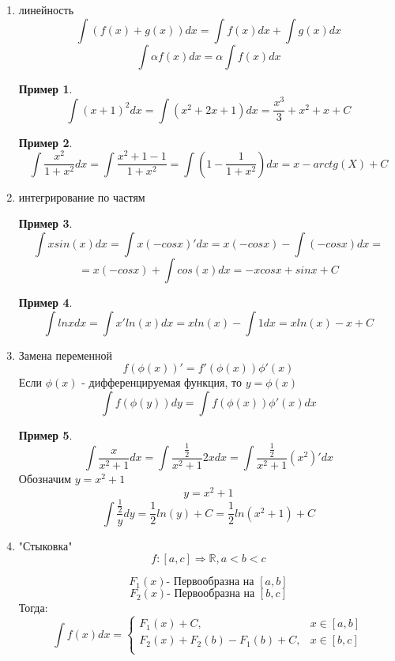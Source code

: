 \documentclass[a4paper]{article}
\theoremstyle{definition}
\newtheorem*{exmp}{Пример}
\newtheorem*{comment}{Замечание}
\numberwithin{theorem}{subsection}
\numberwithin{lemma}{subsection}
\numberwithin{definition}{subsection}
\numberwithin{comment*}{subsection}
\numberwithin{consequence}{subsection}
\numberwithin{property}{subsection}
\begin{document}
\begin{enumerate}
 \item линейность
       $$ \int (f(x) + g(x))dx = \int f(x)dx + \int g(x)dx$$
       $$ \int \alpha f(x) dx = \alpha \int f(x)dx$$
       \begin{exmp}
        $$ \int (x+1)^2 dx = \int (x^2 + 2x + 1)dx = \frac{x^3}{3} + x^2 + x + C $$
       \end{exmp}
       \begin{exmp}
        $$ \int \frac{x^2}{1+x^2} dx = \int \frac{x^2 + 1 -1}{1+x^2} = \int (1 - \frac{1}{1+x^2})dx = x - arctg(X) + C $$
       \end{exmp}
 \item интегрирование по частям

       \begin{exmp}
        $$ \int x sin(x) dx = \int x (-cosx)'dx = x(-cosx) - \int (-cosx)dx =$$
        $$= x(-cosx) + \int cos(x)dx=-xcosx + sinx + C$$
       \end{exmp}
       \begin{exmp}
        $$ \int lnx dx = \int x' ln(x) dx = x ln(x) - \int 1 dx = x ln(x) -x + C$$
       \end{exmp}
 \item Замена переменной
       $$f(\phi(x))'= f'(\phi(x))\phi'(x)$$
       Если $\phi(x)$ - дифференцируемая функция, то $y = \phi(x)$
       $$ \int f(\phi(y))dy = \int f(\phi(x))\phi'(x)dx$$
       \begin{exmp}
        $$ \int \frac{x}{x^2+1} dx = \int \frac{\frac{1}{2}}{x^2+1} 2x dx = \int \frac{\frac{1}{2}}{x^2+1} (x^2)' dx$$
        Обозначим $y = x^2 + 1$
        $$ y = x^2 + 1  $$
        $$ \int  \frac{\frac{1}{2}}{y}dy = \frac{1}{2}ln(y) + C = \frac{1}{2}ln(x^2 + 1) + C$$
       \end{exmp}
 \item "Стыковка"
       $$f:[a,c] \Rightarrow \mathbb{R}, a<b<c$$

       $$ F_1(x) \text{- Первообразна на }[a,b]$$
       $$ F_2(x) \text{- Первообразна на }[b,c]$$
       Тогда:
       $$ \int f(x) dx = \begin{cases}
         F_1(x) + C,               & x\in [a,b] \\
         F_2(x) + F_2(b)-F_1(b)+C, & x\in [b,c] \\
        \end{cases}$$
\end{enumerate}
\end{document}
